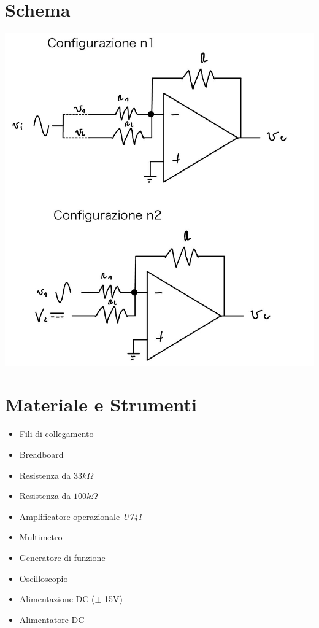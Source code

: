 \documentclass[12pt]{article}
\begin{document}
\section{Schema}
\begin{flushleft}
    \includegraphics[scale=0.28]{schema.jpg}
\end{flushleft}
\section{Materiale e Strumenti}
\label{Materiale e Strumenti}
\begin{multicols}{2}
    \begin{itemize}
    \item Fili di collegamento
    \item Breadboard
    \item Resistenza da $33k\Omega$
    \item Resistenza da $100k\Omega$
    \item Amplificatore operazionale \textit{U741}
    \end{itemize}
    \vfill\null
    \columnbreak
    \begin{itemize}
    \item Multimetro
    \item Generatore di funzione
    \item Oscilloscopio
    \item Alimentazione DC ($\pm$ 15V)
    \item Alimentatore DC
    \end{itemize}
    \vfill\null
    \end{multicols}
\vspace{15pt}
\end{document}
